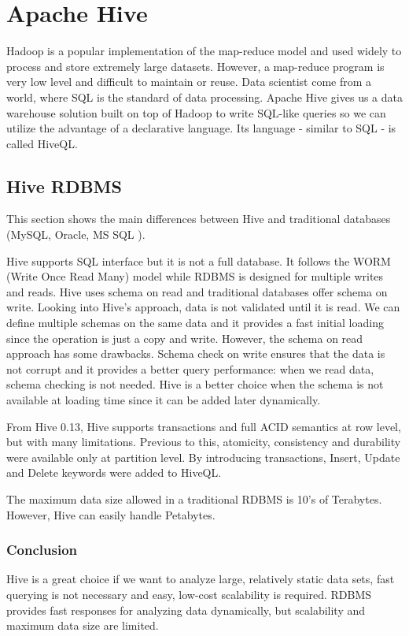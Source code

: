 \chapter{Apache Hive}
Hadoop is a popular implementation of the map-reduce model and used widely to process and store extremely large datasets. However, a map-reduce program is very low level and difficult to maintain or reuse. Data scientist come from a world, where SQL is the standard of data processing. Apache Hive gives us a data warehouse solution built on top of Hadoop to write SQL-like queries so we can utilize the advantage of a declarative language. Its language - similar to SQL - is called HiveQL.

\section{Hive \vs RDBMS}
This section shows the main differences between Hive and traditional databases (\eg MySQL, Oracle, MS SQL \etc).

Hive supports SQL interface but it is not a full database. It follows the WORM (Write Once Read Many) model while RDBMS is designed for multiple writes and reads. Hive uses schema on read and traditional databases offer schema on write. Looking into Hive's approach, data is not validated until it is read. We can define multiple schemas on the same data and it provides a fast initial loading since the operation is just a copy and write. However, the schema on read approach has some drawbacks. Schema check on write ensures that the data is not corrupt and it provides a better query performance: when we read data, schema checking is not needed. Hive is a better choice when the schema is not available at loading time since it can be added later dynamically. 

From Hive 0.13, Hive supports transactions \cite{Hive-apache} and full ACID semantics at row level, but with many limitations. Previous to this, atomicity, consistency and durability were available only at partition level. By introducing transactions, Insert, Update and Delete keywords were added to HiveQL. 

The maximum data size allowed in a traditional RDBMS is 10's of Terabytes. However, Hive can easily handle Petabytes.

\subsection{Conclusion}
Hive is a great choice if we want to analyze large, relatively static data sets, fast querying is not necessary and easy, low-cost scalability is required. RDBMS provides fast responses for analyzing data dynamically, but scalability and maximum data size are limited.

